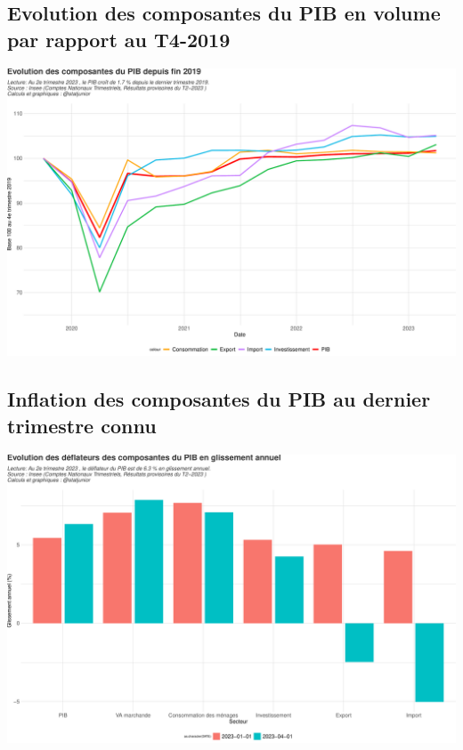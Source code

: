 \documentclass[
  paper=a4,
  ,captions=tableheading
]{scrartcl}
\begin{document}
\hypertarget{evolution-des-composantes-du-pib-en-volume-par-rapport-au-t4-2019}{%
\subsection{Evolution des composantes du PIB en volume par rapport au
T4-2019}\label{evolution-des-composantes-du-pib-en-volume-par-rapport-au-t4-2019}}

\includegraphics{rapport_pdf_compte_branche_files/figure-latex/unnamed-chunk-3-1.pdf}

\hypertarget{inflation-des-composantes-du-pib-au-dernier-trimestre-connu}{%
\subsection{Inflation des composantes du PIB au dernier trimestre
connu}\label{inflation-des-composantes-du-pib-au-dernier-trimestre-connu}}

\includegraphics{rapport_pdf_compte_branche_files/figure-latex/unnamed-chunk-4-1.pdf}
\end{document}
